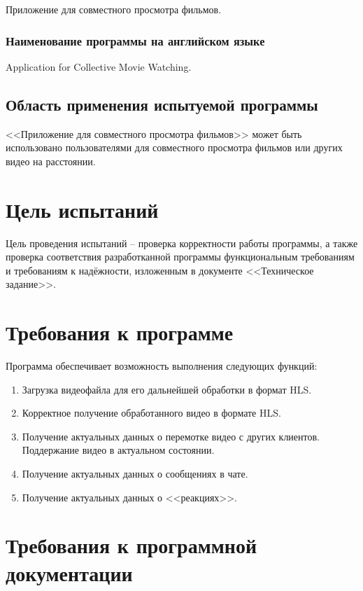 \documentclass{../../includes/TechDocMultiAuthors}
\begin{document}
    Приложение для совместного просмотра фильмов.

    \subsubsection{Наименование программы на английском языке}

    Application for Collective Movie Watching.

    \subsection{Область применения испытуемой программы}

    <<Приложение для совместного просмотра фильмов>> может быть использовано пользователями для совместного просмотра фильмов или других видео на расстоянии.

    \section{Цель испытаний}

    Цель проведения испытаний -- проверка корректности работы программы, а также проверка соответствия разработканной программы функциональным требованиям и требованиям к надёжности, изложенным в документе <<Техническое задание>>.

    \section{Требования к программе}

    Программа обеспечивает возможность выполнения следующих функций:
    \begin{enumerate}
        \item Загрузка видеофайла для его дальнейшей обработки в формат HLS.
        \item Корректное получение обработанного видео в формате HLS.
        \item Получение актуальных данных о перемотке видео с других клиентов.
        Поддержание видео в актуальном состоянии.
        \item Получение актуальных данных о сообщениях в чате.
        \item Получение актуальных данных о <<реакциях>>.
    \end{enumerate}

    \section{Требования к программной документации}
\end{document}
